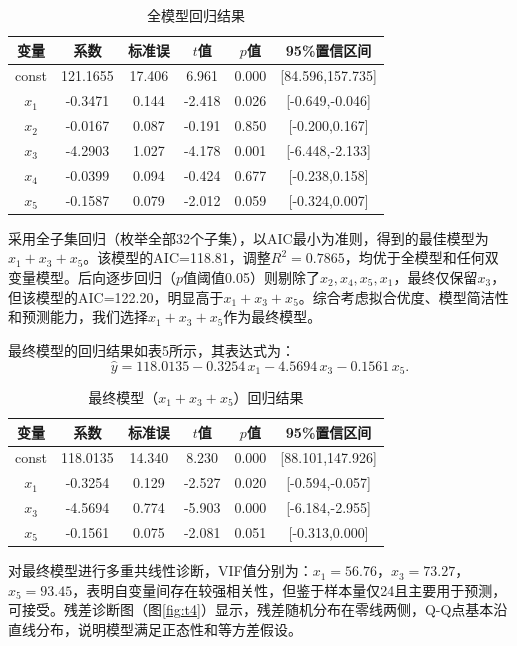 \documentclass[12pt,a4paper]{article}
\begin{document}
\begin{table}[H]
\centering
\caption{全模型回归结果}
\label{tab:full}
\begin{tabular}{cccccc}
\toprule
变量 & 系数 & 标准误 & $t$值 & $p$值 & 95\%置信区间 \\
\midrule
const & 121.1655 & 17.406 & 6.961 & 0.000 & [84.596,157.735] \\
$x_1$ & -0.3471 & 0.144 & -2.418 & 0.026 & [-0.649,-0.046] \\
$x_2$ & -0.0167 & 0.087 & -0.191 & 0.850 & [-0.200,0.167] \\
$x_3$ & -4.2903 & 1.027 & -4.178 & 0.001 & [-6.448,-2.133] \\
$x_4$ & -0.0399 & 0.094 & -0.424 & 0.677 & [-0.238,0.158] \\
$x_5$ & -0.1587 & 0.079 & -2.012 & 0.059 & [-0.324,0.007] \\
\bottomrule
\end{tabular}
\end{table}

采用全子集回归（枚举全部32个子集），以AIC最小为准则，得到的最佳模型为$x_1+x_3+x_5$。该模型的AIC=118.81，调整$R^2=0.7865$，均优于全模型和任何双变量模型。后向逐步回归（$p$值阈值0.05）则剔除了$x_2,x_4,x_5,x_1$，最终仅保留$x_3$，但该模型的AIC=122.20，明显高于$x_1+x_3+x_5$。综合考虑拟合优度、模型简洁性和预测能力，我们选择$x_1+x_3+x_5$作为最终模型。

最终模型的回归结果如表5所示，其表达式为：
\[
\hat{y}=118.0135-0.3254\,x_1-4.5694\,x_3-0.1561\,x_5.
\]

\begin{table}[H]
\centering
\caption{最终模型（$x_1+x_3+x_5$）回归结果}
\label{tab:final}
\begin{tabular}{cccccc}
\toprule
变量 & 系数 & 标准误 & $t$值 & $p$值 & 95\%置信区间 \\
\midrule
const & 118.0135 & 14.340 & 8.230 & 0.000 & [88.101,147.926] \\
$x_1$ & -0.3254 & 0.129 & -2.527 & 0.020 & [-0.594,-0.057] \\
$x_3$ & -4.5694 & 0.774 & -5.903 & 0.000 & [-6.184,-2.955] \\
$x_5$ & -0.1561 & 0.075 & -2.081 & 0.051 & [-0.313,0.000] \\
\bottomrule
\end{tabular}
\end{table}

对最终模型进行多重共线性诊断，VIF值分别为：$x_1=56.76$，$x_3=73.27$，$x_5=93.45$，表明自变量间存在较强相关性，但鉴于样本量仅24且主要用于预测，可接受。残差诊断图（图\ref{fig:t4}）显示，残差随机分布在零线两侧，Q-Q点基本沿直线分布，说明模型满足正态性和等方差假设。
\end{document}
